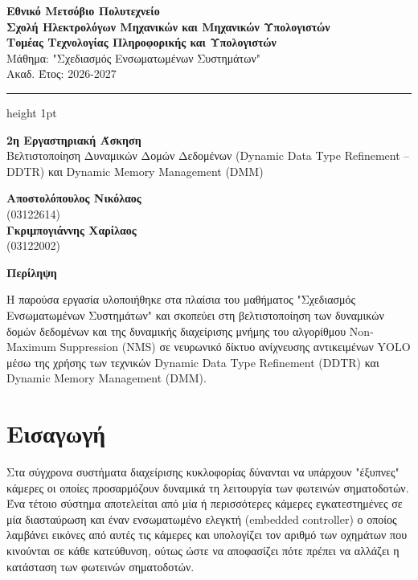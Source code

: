 \documentclass[12pt]{article}
\begin{document}
\noindent
\begin{minipage}[t]{\textwidth}
    {\large \textbf{Εθνικό Μετσόβιο Πολυτεχνείο}} \\
    \textbf{Σχολή Ηλεκτρολόγων Μηχανικών και Μηχανικών Υπολογιστών} \\    
    \textbf{Τομέας Τεχνολογίας Πληροφορικής και Υπολογιστών} \\
    Μάθημα: "Σχεδιασμός Ενσωματωμένων Συστημάτων" \\
    Ακαδ. Έτος: 2026-2027
\end{minipage}

\vspace{0.2cm}
\hrule height 1pt
\vspace{1cm}


\begin{center}
    {\LARGE \textbf{2η Εργαστηριακή Άσκηση}} \\[0.5cm]
    {\large Βελτιστοποίηση Δυναμικών Δομών Δεδομένων (Dynamic Data Type Refinement – DDTR) και Dynamic Memory Management (DMM)}
\end{center}
\vspace{1cm}


\begin{center}
	\textbf{Αποστολόπουλος Νικόλαος} \\
	(03122614) \\
	\textbf{Γκριμπογιάννης Χαρίλαος} \\
	(03122002)
\end{center}
\vspace{1cm}

\begin{center}
    \textbf{\large Περίληψη}
\end{center}

\noindent
Η παρούσα εργασία υλοποιήθηκε στα πλαίσια του μαθήματος "Σχεδιασμός Ενσωματωμένων Συστημάτων" και σκοπεύει στη βελτιστοποίηση των δυναμικών δομών δεδομένων και της δυναμικής διαχείρισης μνήμης του αλγορίθμου Non-Maximum Suppression (NMS) σε νευρωνικό δίκτυο ανίχνευσης αντικειμένων YOLO μέσω της χρήσης των τεχνικών Dynamic Data Type Refinement (DDTR) και Dynamic Memory Management (DMM).
\pagebreak

\tableofcontents
\pagebreak

\section*{Εισαγωγή}
Στα σύγχρονα συστήματα διαχείρισης κυκλοφορίας δύνανται να υπάρχουν "έξυπνες" κάμερες οι οποίες προσαρμόζουν δυναμικά τη λειτουργία των φωτεινών σηματοδοτών. Ένα τέτοιο σύστημα αποτελείται από μία ή περισσότερες κάμερες εγκατεστημένες σε μία διασταύρωση και έναν ενσωματωμένο ελεγκτή (embedded controller) ο οποίος λαμβάνει εικόνες από αυτές τις κάμερες και υπολογίζει τον αριθμό των οχημάτων που κινούνται σε κάθε κατεύθυνση, ούτως ώστε να αποφασίζει πότε πρέπει να αλλάζει η κατάσταση των φωτεινών σηματοδοτών.
\end{document}
